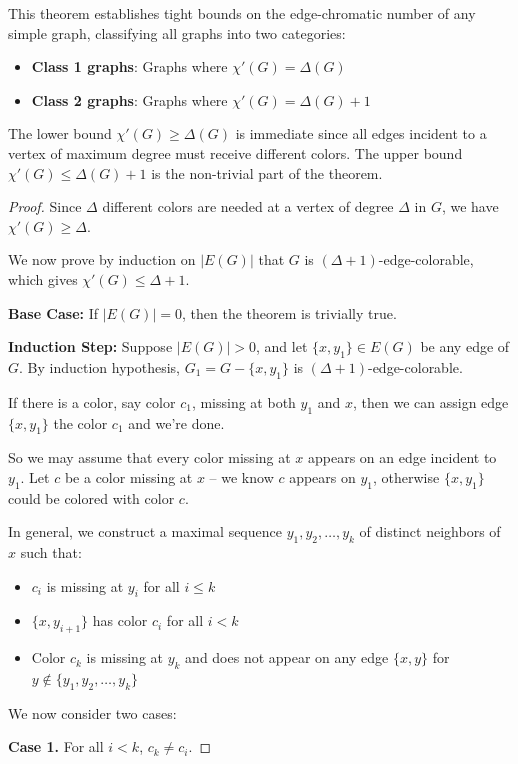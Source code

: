 \documentclass{article}
\theoremstyle{definition}
\begin{document}
This theorem establishes tight bounds on the edge-chromatic number of any simple graph, classifying all graphs into two categories:
\begin{itemize}
\item \textbf{Class 1 graphs}: Graphs where $\chi'(G) = \Delta(G)$
\item \textbf{Class 2 graphs}: Graphs where $\chi'(G) = \Delta(G) + 1$
\end{itemize}

The lower bound $\chi'(G) \geq \Delta(G)$ is immediate since all edges incident to a vertex of maximum degree must receive different colors. The upper bound $\chi'(G) \leq \Delta(G) + 1$ is the non-trivial part of the theorem.


\begin{proof}
Since $\Delta$ different colors are needed at a vertex of degree $\Delta$ in $G$, we have $\chi'(G) \geq \Delta$. 

We now prove by induction on $|E(G)|$ that $G$ is $(\Delta + 1)$-edge-colorable, which gives $\chi'(G) \leq \Delta + 1$. 

\textbf{Base Case:} If $|E(G)| = 0$, then the theorem is trivially true.

\textbf{Induction Step:} Suppose $|E(G)| > 0$, and let $\{x, y_1\} \in E(G)$ be any edge of $G$. By induction hypothesis, $G_1 = G - \{x, y_1\}$ is $(\Delta + 1)$-edge-colorable. 

If there is a color, say color $c_1$, missing at both $y_1$ and $x$, then we can assign edge $\{x, y_1\}$ the color $c_1$ and we're done.

So we may assume that every color missing at $x$ appears on an edge incident to $y_1$. Let $c$ be a color missing at $x$ – we know $c$ appears on $y_1$, otherwise $\{x, y_1\}$ could be colored with color $c$.

In general, we construct a maximal sequence $y_1, y_2, \ldots, y_k$ of distinct neighbors of $x$ such that:
\begin{itemize}
\item $c_i$ is missing at $y_i$ for all $i \leq k$
\item $\{x, y_{i+1}\}$ has color $c_i$ for all $i < k$
\item Color $c_k$ is missing at $y_k$ and does not appear on any edge $\{x, y\}$ for $y \not\in \{y_1, y_2, \ldots, y_k\}$
\end{itemize}

We now consider two cases:

\textbf{Case 1.} For all $i < k$, $c_k \neq c_i$. 


\end{proof}
\end{document}
